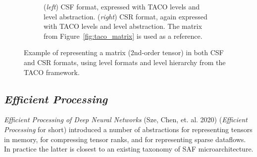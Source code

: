 \begin{figure}[H]
\begin{subfigure}[b]{0.4\textwidth}
        \caption{(\textit{left}) CSF format, expressed with TACO levels and level abstraction. (\textit{right}) CSR format, again expressed with TACO levels and level abstraction. The matrix from Figure~\ref{fig:taco_matrix} is used as a reference.}
        \label{fig:taco_csf_csr}
    \end{subfigure}
    \caption{Example of representing a matrix (2nd-order tensor) in both CSF and CSR formats, using level formats and level hierarchy from the TACO framework.}
\end{figure}

\begin{table}[h]
\centering
\caption{An excerpt from Table 1 of the TACO sparse format paper\cite{taco_format} showing the abstract interface to each TACO level format. V: supports coordinate value iteration.  P: supports position iteration. I: supports insert. A: supports append. (\checkmark) indicates that the particular property is contingent on the fiber configuration, whereas a normal checkmark indicates full support.}
\label{tab:taco_capabilities_properties}
\end{table}


\subsection{\textit{Efficient Processing}}

\textit{Efficient Processing of Deep Neural Networks}\cite{szebook} (Sze, Chen, et. al. 2020) (\textit{Efficient Processing} for short) introduced a number of abstractions for representing tensors in memory, for compressing tensor ranks, and for representing sparse dataflows. In practice the latter is closest to an existing taxonomy of SAF microarchitecture. 

